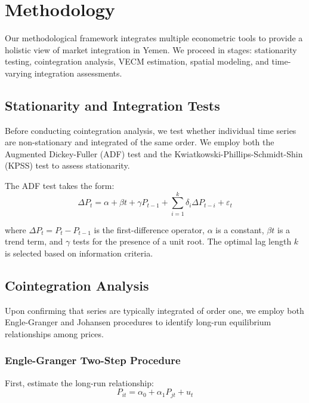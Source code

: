 \section{Methodology}
\small  %

Our methodological framework integrates multiple econometric tools to provide a holistic view of market integration in Yemen. We proceed in stages: stationarity testing, cointegration analysis, VECM estimation, spatial modeling, and time-varying integration assessments.

\subsection{Stationarity and Integration Tests}
Before conducting cointegration analysis, we test whether individual time series are non-stationary and integrated of the same order. We employ both the Augmented Dickey-Fuller (ADF) test \citep{dickey1979distribution} and the Kwiatkowski-Phillips-Schmidt-Shin (KPSS) test \citep{kwiatkowski1992testing} to assess stationarity.

The ADF test takes the form:
\vspace{-0.5em}
\begin{equation}
\Delta P_t = \alpha + \beta t + \gamma P_{t-1} + \sum_{i=1}^{k} \delta_i \Delta P_{t-i} + \varepsilon_t
\end{equation}
\vspace{-0.5em}

where $\Delta P_t = P_t - P_{t-1}$ is the first-difference operator, $\alpha$ is a constant, $\beta t$ is a trend term, and $\gamma$ tests for the presence of a unit root. The optimal lag length $k$ is selected based on information criteria.

\subsection{Cointegration Analysis}
Upon confirming that series are typically integrated of order one, we employ both Engle-Granger \citep{engle1987cointegration} and Johansen \citep{johansen1988statistical} procedures to identify long-run equilibrium relationships among prices.

\subsubsection{Engle-Granger Two-Step Procedure}
First, estimate the long-run relationship:
\vspace{-0.5em}
\begin{equation}
P_{it} = \alpha_0 + \alpha_1 P_{jt} + u_t
\end{equation}
\vspace{-0.5em}

